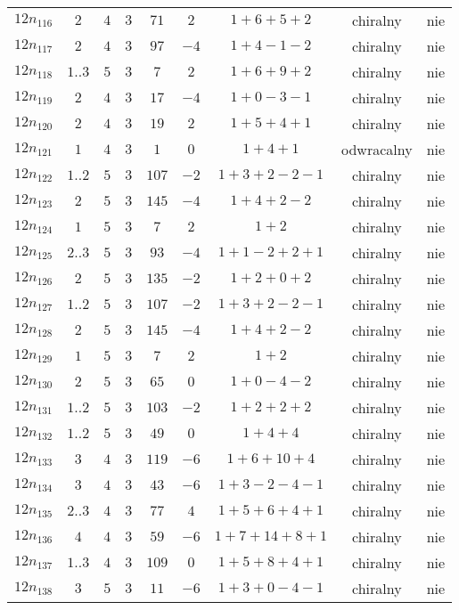 \begin{longtable}{ccccccccc}
$12n_{116}$ & $2$ & $4$ & $3$ & $71$ & $2$ & $1+6+5+2$ & chiralny & nie \\
$12n_{117}$ & $2$ & $4$ & $3$ & $97$ & $-4$ & $1+4-1-2$ & chiralny & nie \\
$12n_{118}$ & $1..3$ & $5$ & $3$ & $7$ & $2$ & $1+6+9+2$ & chiralny & nie \\
$12n_{119}$ & $2$ & $4$ & $3$ & $17$ & $-4$ & $1+0-3-1$ & chiralny & nie \\
$12n_{120}$ & $2$ & $4$ & $3$ & $19$ & $2$ & $1+5+4+1$ & chiralny & nie \\
$12n_{121}$ & $1$ & $4$ & $3$ & $1$ & $0$ & $1+4+1$ & odwracalny & nie \\
$12n_{122}$ & $1..2$ & $5$ & $3$ & $107$ & $-2$ & $1+3+2-2-1$ & chiralny & nie \\
$12n_{123}$ & $2$ & $5$ & $3$ & $145$ & $-4$ & $1+4+2-2$ & chiralny & nie \\
$12n_{124}$ & $1$ & $5$ & $3$ & $7$ & $2$ & $1+2$ & chiralny & nie \\
$12n_{125}$ & $2..3$ & $5$ & $3$ & $93$ & $-4$ & $1+1-2+2+1$ & chiralny & nie \\
$12n_{126}$ & $2$ & $5$ & $3$ & $135$ & $-2$ & $1+2+0+2$ & chiralny & nie \\
$12n_{127}$ & $1..2$ & $5$ & $3$ & $107$ & $-2$ & $1+3+2-2-1$ & chiralny & nie \\
$12n_{128}$ & $2$ & $5$ & $3$ & $145$ & $-4$ & $1+4+2-2$ & chiralny & nie \\
$12n_{129}$ & $1$ & $5$ & $3$ & $7$ & $2$ & $1+2$ & chiralny & nie \\
$12n_{130}$ & $2$ & $5$ & $3$ & $65$ & $0$ & $1+0-4-2$ & chiralny & nie \\
$12n_{131}$ & $1..2$ & $5$ & $3$ & $103$ & $-2$ & $1+2+2+2$ & chiralny & nie \\
$12n_{132}$ & $1..2$ & $5$ & $3$ & $49$ & $0$ & $1+4+4$ & chiralny & nie \\
$12n_{133}$ & $3$ & $4$ & $3$ & $119$ & $-6$ & $1+6+10+4$ & chiralny & nie \\
$12n_{134}$ & $3$ & $4$ & $3$ & $43$ & $-6$ & $1+3-2-4-1$ & chiralny & nie \\
$12n_{135}$ & $2..3$ & $4$ & $3$ & $77$ & $4$ & $1+5+6+4+1$ & chiralny & nie \\
$12n_{136}$ & $4$ & $4$ & $3$ & $59$ & $-6$ & $1+7+14+8+1$ & chiralny & nie \\
$12n_{137}$ & $1..3$ & $4$ & $3$ & $109$ & $0$ & $1+5+8+4+1$ & chiralny & nie \\
$12n_{138}$ & $3$ & $5$ & $3$ & $11$ & $-6$ & $1+3+0-4-1$ & chiralny & nie \\

\end{longtable}
